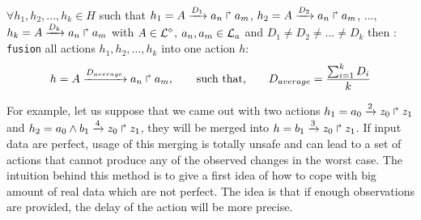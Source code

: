 \begin{definition}
$\forall h_1, h_2,..., h_k \in H$ such that $h_1=A\xrightarrow{D_1} a_n \Rsh a_m$, $h_2=A\xrightarrow{D_2} a_n \Rsh a_m$, ..., $h_k=A\xrightarrow{D_k} a_n \Rsh a_m$ with $ A \in \mathcal{L}^{\diamond}$, $a_n, a_m \in \mathcal{L}_a$ and $D_1 \neq D_2 \neq ... \neq D_k$ then : \\
\texttt{fusion} all actions $h_1, h_2,..., h_k$ into one action $h$: $$h=A\xrightarrow{D_{average}} a_n \Rsh a_m, \hspace{0.7cm} \text{such that,} \hspace{0.7cm} D_{average} = \frac{\sum_{i=1}^k D_{i}}{k} $$
\end{definition}

For example, let us suppose that we came out with two actions $h_1=a_0\xrightarrow{2} z_0 \Rsh z_1$ and $h_2=a_0 \wedge b_1 \xrightarrow{4} z_0 \Rsh z_1$, they will be merged into $h=b_1\xrightarrow{3} z_0 \Rsh z_1$.
If input data are perfect, usage of this merging is totally unsafe and can lead to a set of actions that cannot produce any of the observed changes in the worst case.
The intuition behind this method is to give a first idea of how to cope with big amount of real data which are not perfect.
The idea is that if enough observations are provided, the delay of the action will be more precise.
